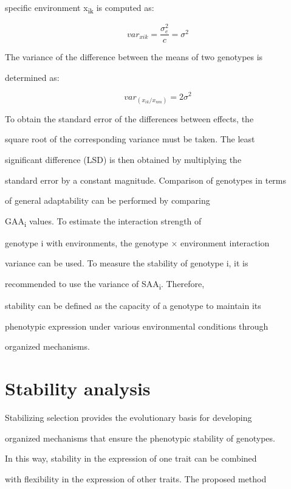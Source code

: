 \documentclass[10pt,twoside]{article}
\numberwithin{equation}{section}
\begin{document}
specific environment x\textsubscript{ik} is computed as:



\[{var}_{xik} = \frac{\sigma_{e}^{2}}{c} = \sigma^{2}\]



The variance of the difference between the means of two genotypes is

determined as:



\[{var}_{(x_{ik}/x_{nm})} = 2\sigma^{2}\]



To obtain the standard error of the differences between effects, the

square root of the corresponding variance must be taken. The least

significant difference (LSD) is then obtained by multiplying the

standard error by a constant magnitude. Comparison of genotypes in terms

of general adaptability can be performed by comparing

GAA\textsubscript{i} values. To estimate the interaction strength of

genotype i with environments, the genotype × environment interaction

variance can be used. To measure the stability of genotype i, it is

recommended to use the variance of SAA\textsubscript{i}. Therefore,

stability can be defined as the capacity of a genotype to maintain its

phenotypic expression under various environmental conditions through

organized mechanisms.



\section{Stability analysis}



Stabilizing selection provides the evolutionary basis for developing

organized mechanisms that ensure the phenotypic stability of genotypes.

In this way, stability in the expression of one trait can be combined

with flexibility in the expression of other traits. The proposed method
\end{document}
